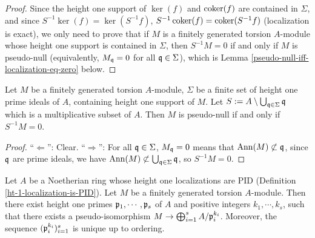 \begin{proof}
\leanok
Since the height one support of $\ker(f)$ and $\operatorname{coker}(f)$
are contained in $\Sigma$,
and since $S^{-1}\ker(f)=\ker(S^{-1}f)$,
$S^{-1}\operatorname{coker}(f)=\operatorname{coker}(S^{-1}f)$ (localization is exact),
we only need to prove that if $M$ is a finitely generated torsion $A$-module
whose height one support is contained in $\Sigma$,
then $S^{-1}M=0$ if and only if $M$ is pseudo-null (equivalently, $M_{\mathfrak{q}}=0$
for all ${\mathfrak{q}}\in\Sigma$), which is Lemma \ref{pseudo-null-iff-localization-eq-zero} below.
\end{proof}

\begin{lem}
\label{pseudo-null-iff-localization-eq-zero}
\leanok
Let $M$ be a finitely generated torsion $A$-module, $\Sigma$ be a finite set of height one prime ideals of $A$,
containing height one support of $M$.
Let $S:=A\setminus\bigcup_{{\mathfrak{q}}\in\Sigma}{\mathfrak{q}}$ which is a multiplicative subset of $A$.
Then $M$ is pseudo-null if and only if $S^{-1}M=0$.
\end{lem}

\begin{proof}
\leanok
``$\Leftarrow$'': Clear.
``$\Rightarrow$'': For all ${\mathfrak{q}}\in\Sigma$, $M_{\mathfrak{q}}=0$ means that ${\mathrm{Ann}}(M)\not\subset{\mathfrak{q}}$,
since ${\mathfrak{q}}$ are prime ideals, we have ${\mathrm{Ann}}(M)\not\subset\bigcup_{{\mathfrak{q}}\in\Sigma}{\mathfrak{q}}$,
so $S^{-1}M=0$.
\end{proof}

\begin{prop}
\label{structure-thm}
Let $A$ be a Noetherian ring whose height one localizations are PID
(Definition \ref{ht-1-localization-is-PID}).
Let $M$ be a finitely generated torsion $A$-module.
Then there exist height one primes ${\mathfrak{p}}_1,\cdots,{\mathfrak{p}}_s$ of $A$
and positive integers $k_1,\cdots,k_s$, such that there exists a pseudo-isomorphism
$M\to\bigoplus_{i=1}^s A/{\mathfrak{p}}_i^{k_i}$.
Moreover, the sequence $({\mathfrak{p}}_i^{k_i})_{i=1}^s$ is unique up to ordering.
\end{prop}

